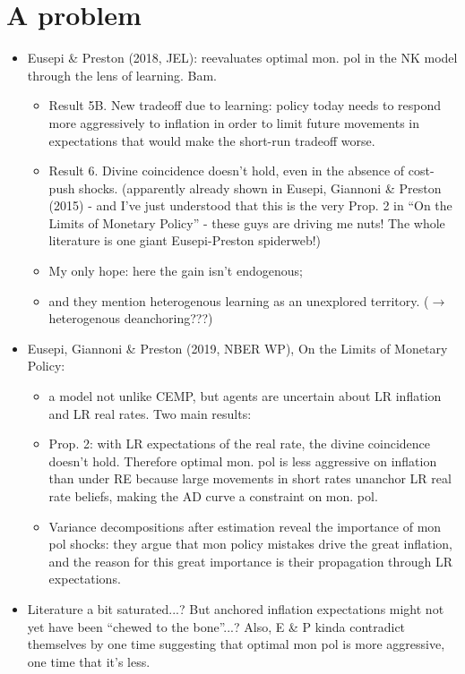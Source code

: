\documentclass[11pt]{article}
\renewcommand{\[}{\begin{equation}}
\renewcommand{\]}{\end{equation}}
\begin{document}
\section{A problem}
\begin{itemize}
\item Eusepi \& Preston (2018, JEL): reevaluates optimal mon. pol in the NK model through the lens of learning. Bam. 
\begin{itemize}
\item Result 5B. New tradeoff due to learning: policy today needs to respond more aggressively to inflation in order to limit future movements in expectations that would make the short-run tradeoff worse. 
\item Result 6. Divine coincidence doesn't hold, even in the absence of cost-push shocks. (apparently already shown in Eusepi, Giannoni \& Preston (2015) - and I've just understood that this is the very Prop. 2 in ``On the Limits of Monetary Policy'' - these guys are driving me nuts! The whole literature is one giant Eusepi-Preston spiderweb!)
\item My only hope:  here the gain isn't endogenous;
\item and they mention heterogenous learning as an unexplored territory. ($\rightarrow$ heterogenous deanchoring???)
\end{itemize}
\item Eusepi, Giannoni \& Preston (2019, NBER WP), On the Limits of Monetary Policy:
\begin{itemize}
\item a model not unlike CEMP, but agents are uncertain about LR inflation and LR real rates. Two main results:
\item Prop. 2: with LR expectations of the real rate, the divine coincidence doesn't hold. Therefore optimal mon. pol is less aggressive on inflation than under RE because large movements in short rates unanchor LR real rate beliefs, making the AD curve a constraint on mon. pol. 
\item Variance decompositions after estimation reveal the importance of mon pol shocks: they argue that mon policy mistakes drive the great inflation, and the reason for this great importance is their propagation through LR expectations. 
\end{itemize}
\item Literature a bit saturated...? But anchored inflation expectations might not yet have been ``chewed to the bone''...? Also, E \& P kinda contradict themselves by one time suggesting that optimal mon pol is more aggressive, one time that it's less. 
\end{itemize}
\end{document}
